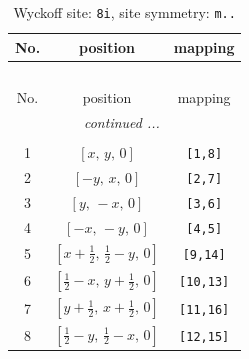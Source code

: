 \documentclass[fleqn,8pt]{jsarticle}
\begin{document}
\renewcommand{\arraystretch}{1.2}
\begin{longtable}{ccc}
\caption{Wyckoff site: {\tt 8i}, site symmetry: {\tt m..}}
 \\
 \hline \hline
No. & position & mapping \\ \hline \endfirsthead

\multicolumn{2}{l}{\tablename\ \thetable{}} \\
 \hline \hline
No. & position & mapping \\ \hline \endhead

 \hline \hline
\multicolumn{2}{r}{\footnotesize\it continued ...} \\ \endfoot

 \hline \hline
\multicolumn{2}{r}{} \\ \endlastfoot

1 & $\left[ x,\, y,\, 0 \right]$ & {\tt [1,8]} \\ \hline
2 & $\left[ - y,\, x,\, 0 \right]$ & {\tt [2,7]} \\ \hline
3 & $\left[ y,\, - x,\, 0 \right]$ & {\tt [3,6]} \\ \hline
4 & $\left[ - x,\, - y,\, 0 \right]$ & {\tt [4,5]} \\ \hline
5 & $\left[ x + \frac{1}{2},\, \frac{1}{2} - y,\, 0 \right]$ & {\tt [9,14]} \\ \hline
6 & $\left[ \frac{1}{2} - x,\, y + \frac{1}{2},\, 0 \right]$ & {\tt [10,13]} \\ \hline
7 & $\left[ y + \frac{1}{2},\, x + \frac{1}{2},\, 0 \right]$ & {\tt [11,16]} \\ \hline
8 & $\left[ \frac{1}{2} - y,\, \frac{1}{2} - x,\, 0 \right]$ & {\tt [12,15]} \\
\end{longtable}
\renewcommand{\arraystretch}{1.2}
\end{document}
